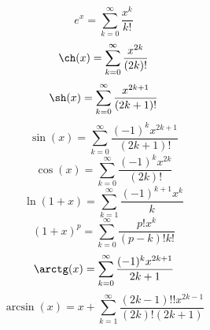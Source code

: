 \documentclass{article}
\begin{document}
$$
e^x = \sum_{k=0}^{\infty} \frac{x^k}{k!}
$$
$$
\ch(x) = \sum_{k=0}^{\infty} \frac{x^{2k}}{(2k)!}
$$
$$
\sh(x) = \sum_{k=0}^{\infty} \frac{x^{2k + 1}}{(2k +1)!}
$$
$$
\sin(x) = \sum_{k=0}^{\infty} \frac{(-1)^k x^{2k+1}}{(2k+1)!}
$$
$$
\cos(x) = \sum_{k=0}^{\infty} \frac{(-1)^k x^{2k}}{(2k)!}
$$
$$
\ln(1 + x) = \sum_{k=1}^{\infty} \frac{(-1)^{k+1} x^k}{k}
$$
$$
(1+x)^p = \sum_{k=0}^{\infty} \frac{p! x^k}{(p - k)! k!}
$$
$$
\arctg(x) = \sum_{k=0}^{\infty} \frac{(-1)^k x^{2k+1}}{2k + 1}
$$
$$
\arcsin(x) = x + \sum_{k=1}^{\infty}
\frac{(2k - 1)!! x^{2k-1}}{(2k)! (2k+1)}
$$
\end{document}
